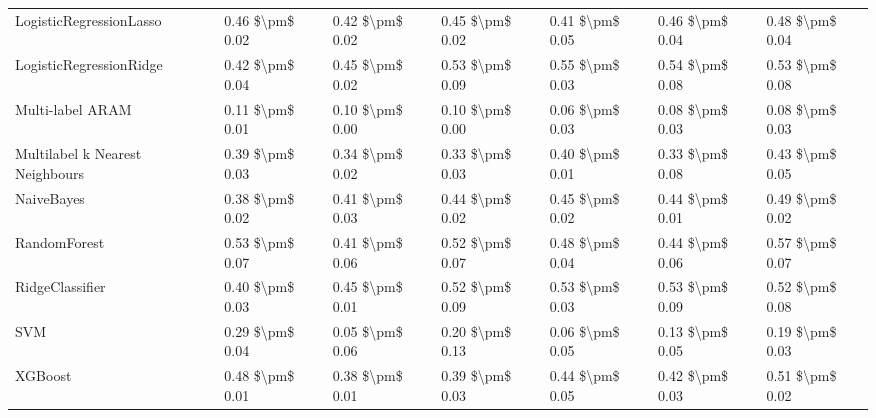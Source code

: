 \begin{tabular}{lllllll}
LogisticRegressionLasso         &  0.46 \$\textbackslash pm\$ 0.02 &           0.42 \$\textbackslash pm\$ 0.02 &       0.45 \$\textbackslash pm\$ 0.02 &        0.41 \$\textbackslash pm\$ 0.05 &                         0.46 \$\textbackslash pm\$ 0.04 &      0.48 \$\textbackslash pm\$ 0.04 \\
LogisticRegressionRidge         &  0.42 \$\textbackslash pm\$ 0.04 &           0.45 \$\textbackslash pm\$ 0.02 &       0.53 \$\textbackslash pm\$ 0.09 &        0.55 \$\textbackslash pm\$ 0.03 &                         0.54 \$\textbackslash pm\$ 0.08 &      0.53 \$\textbackslash pm\$ 0.08 \\
Multi-label ARAM                &  0.11 \$\textbackslash pm\$ 0.01 &           0.10 \$\textbackslash pm\$ 0.00 &       0.10 \$\textbackslash pm\$ 0.00 &        0.06 \$\textbackslash pm\$ 0.03 &                         0.08 \$\textbackslash pm\$ 0.03 &      0.08 \$\textbackslash pm\$ 0.03 \\
Multilabel k Nearest Neighbours &  0.39 \$\textbackslash pm\$ 0.03 &           0.34 \$\textbackslash pm\$ 0.02 &       0.33 \$\textbackslash pm\$ 0.03 &        0.40 \$\textbackslash pm\$ 0.01 &                         0.33 \$\textbackslash pm\$ 0.08 &      0.43 \$\textbackslash pm\$ 0.05 \\
NaiveBayes                      &  0.38 \$\textbackslash pm\$ 0.02 &           0.41 \$\textbackslash pm\$ 0.03 &       0.44 \$\textbackslash pm\$ 0.02 &        0.45 \$\textbackslash pm\$ 0.02 &                         0.44 \$\textbackslash pm\$ 0.01 &      0.49 \$\textbackslash pm\$ 0.02 \\
RandomForest                    &  0.53 \$\textbackslash pm\$ 0.07 &           0.41 \$\textbackslash pm\$ 0.06 &       0.52 \$\textbackslash pm\$ 0.07 &        0.48 \$\textbackslash pm\$ 0.04 &                         0.44 \$\textbackslash pm\$ 0.06 &      0.57 \$\textbackslash pm\$ 0.07 \\
RidgeClassifier                 &  0.40 \$\textbackslash pm\$ 0.03 &           0.45 \$\textbackslash pm\$ 0.01 &       0.52 \$\textbackslash pm\$ 0.09 &        0.53 \$\textbackslash pm\$ 0.03 &                         0.53 \$\textbackslash pm\$ 0.09 &      0.52 \$\textbackslash pm\$ 0.08 \\
SVM                             &  0.29 \$\textbackslash pm\$ 0.04 &           0.05 \$\textbackslash pm\$ 0.06 &       0.20 \$\textbackslash pm\$ 0.13 &        0.06 \$\textbackslash pm\$ 0.05 &                         0.13 \$\textbackslash pm\$ 0.05 &      0.19 \$\textbackslash pm\$ 0.03 \\
XGBoost                         &  0.48 \$\textbackslash pm\$ 0.01 &           0.38 \$\textbackslash pm\$ 0.01 &       0.39 \$\textbackslash pm\$ 0.03 &        0.44 \$\textbackslash pm\$ 0.05 &                         0.42 \$\textbackslash pm\$ 0.03 &      0.51 \$\textbackslash pm\$ 0.02 \\
\bottomrule
\end{tabular}
